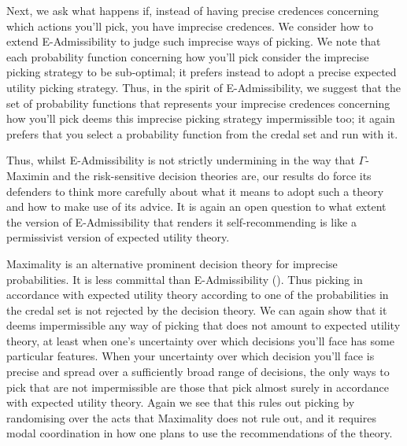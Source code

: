 \documentclass[a4paper]{article}
\newenvironment{CCM rewritten}
{\begingroup\color{blue}} %
{\endgroup}              %
\begin{document}
	 Next, we ask what happens if, instead of having precise credences concerning which actions you'll pick, you have imprecise credences. We consider how to extend E-Admissibility to judge such imprecise ways of picking.	 
	 We note that each probability function concerning how you'll pick consider the imprecise picking strategy to be sub-optimal; it 
	  prefers instead to adopt a precise expected utility picking strategy. Thus, in the spirit of E-Admissibility, we suggest that the set of probability functions that represents your imprecise credences concerning how you'll pick deems this imprecise picking strategy impermissible too; it again prefers that you select a probability function from the credal set and run with it. 
	 
 	Thus, whilst E-Admissibility is not strictly undermining in the way that $\Gamma$-Maximin and the risk-sensitive decision theories are, our results do force its defenders to think more carefully about what it means to adopt such a theory and how to make use of its advice. It is again an open question to what extent the version of E-Admissibility that renders it self-recommending is like a permissivist version of expected utility theory. %
	 
	 Maximality is an alternative prominent decision theory for imprecise probabilities. It is less committal than E-Admissibility (). Thus picking in accordance with expected utility theory according to one of the probabilities in the credal set is not rejected by the decision theory. 
	 We can again show that it deems impermissible any way of picking that does not amount to expected utility theory, at least when one's uncertainty over which decisions you'll face has some particular features. When your uncertainty over which decision you'll face is precise and spread over a sufficiently broad range of decisions, the only ways to pick that are not impermissible are those that pick almost surely in accordance with expected utility theory. Again we see that this rules out picking by randomising over the acts that Maximality does not rule out, and it requires modal coordination in how one plans to use the recommendations of the theory. 
	 
	 
	 
	 
	 
	
\end{document}

